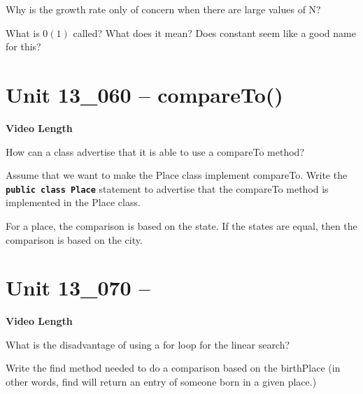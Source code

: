 \documentclass[letterpaper,12pt]{exam}
\newcommand{\unit}{Unit 13}
\begin{document}
\begin{questions}
\begin{samepage}
    \question Why is the growth rate only of concern when there are large values of N?
    \vspace{5mm}
\end{samepage}

\begin{samepage}
    \question What is $0(1)$ called?  What does it mean?  Does constant seem like a good name for this?
    \vspace{15mm}
\end{samepage}



\section*{\unit\_060 -- compareTo()} 
\par{\selectfont\textbf{Video Length }}

\begin{samepage}
    \question How can a class advertise that it is able to use a compareTo method?
    \vspace{5mm}
\end{samepage}
\begin{samepage}
    \question Assume that we want to make the Place class implement compareTo.  Write the \texttt{\textbf{public class Place}} statement to advertise that the compareTo method is implemented in the Place class.
    \vspace{5mm}
\end{samepage}
\begin{samepage}
    \question For a place, the comparison is based on the state.  If the states are equal, then the comparison is based on the city. 
    \vspace{55mm}
\end{samepage}


\section*{\unit\_070 -- } 
\par{\selectfont\textbf{Video Length }}

\begin{samepage}
    \question What is the disadvantage of using a for loop for the linear search?
    \vspace{5mm}
\end{samepage}
\begin{samepage}
    \question Write the find method needed to do a comparison based on the birthPlace (in other words, find will return an entry of someone born in a given place.)
    \vspace{55mm}
\end{samepage}



\end{questions}
\end{document}
